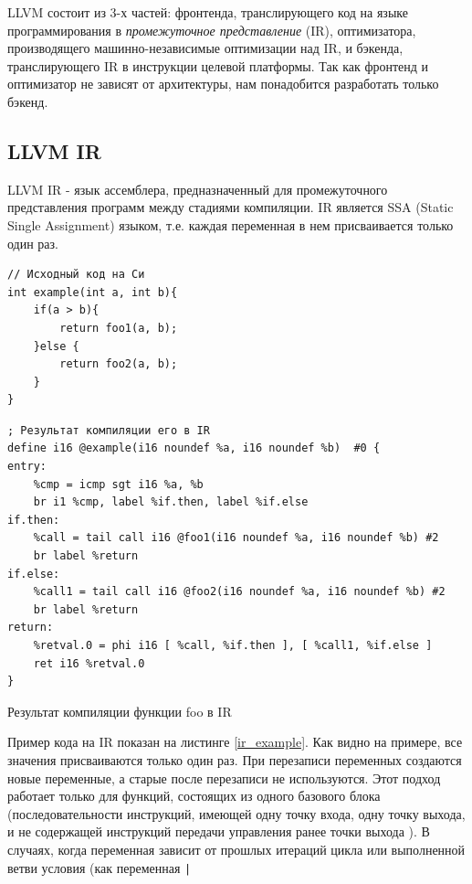 \documentclass[a4paper,14pt]{extarticle}
\begin{document}
LLVM состоит из 3-х частей: фронтенда, транслирующего код на языке программирования в \emph{промежуточное представление} (IR)\cite{llvm:langref}, оптимизатора, производящего машинно-независимые оптимизации над IR, и бэкенда, транслирующего IR в инструкции целевой платформы. Так как фронтенд и оптимизатор не зависят от архитектуры, нам %
понадобится разработать только бэкенд.

\subsection{LLVM IR}
LLVM IR - язык ассемблера, предназначенный для промежуточного представления программ между стадиями компиляции. IR является SSA (Static Single Assignment) языком, т.е. каждая переменная в нем присваивается только один раз. 
\begin{listing}[h!]
	\begin{verbatim}
// Исходный код на Си
int example(int a, int b){
	if(a > b){
		return foo1(a, b);
	}else {
		return foo2(a, b);
	}
}
	\end{verbatim}
	
	\begin{verbatim}
; Результат компиляции его в IR
define i16 @example(i16 noundef %a, i16 noundef %b)  #0 {
entry:
	%cmp = icmp sgt i16 %a, %b
	br i1 %cmp, label %if.then, label %if.else
if.then: 
	%call = tail call i16 @foo1(i16 noundef %a, i16 noundef %b) #2
	br label %return
if.else: 
	%call1 = tail call i16 @foo2(i16 noundef %a, i16 noundef %b) #2
	br label %return
return: 
	%retval.0 = phi i16 [ %call, %if.then ], [ %call1, %if.else ]
	ret i16 %retval.0
}
	\end{verbatim}
	\caption{Результат компиляции функции foo в IR}
	\label{ir_example}
\end{listing}

Пример кода на IR показан на листинге \ref{ir_example}. Как видно на примере, все значения присваиваются только один раз. При перезаписи переменных создаются новые переменные, а старые после перезаписи не используются. Этот подход работает только для функций, состоящих из одного базового блока (последовательности инструкций, имеющей одну точку входа, одну точку выхода, и не содержащей инструкций передачи управления ранее точки выхода \cite{contraol_flow_analysis}). В случаях, когда переменная зависит от прошлых итераций цикла или выполненной ветви условия  (как переменная \texttt|%
\end{document}

